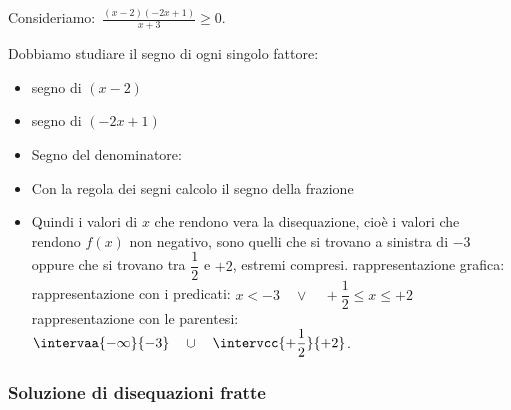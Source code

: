  \begin{esempio}{}{}
Consideriamo:~\(\frac{(x-2)(-2x+1)}{x+3} \geqslant 0\).

Dobbiamo studiare il segno di ogni singolo fattore:
\begin{itemize} [noitemsep, left=0mm]
\item segno di \((x-2)\)\\
\hspace*{-5mm} 
\item segno di \((-2x+1)\)\\
\hspace*{-5mm} 
 \item Segno del denominatore:\\
\hspace*{-5mm} 
\item Con la regola dei segni calcolo il segno della frazione 

\segnomistadisa
\item Quindi i valori di \(x\) che rendono vera la disequazione, cioè i 
valori che rendono \(f(x)\) non negativo, sono quelli 
che si trovano a sinistra di \(-3\) oppure che si trovano 
tra \(\dfrac{1}{2}\) e \(+2\), estremi compresi.
\subitem 
rappresentazione grafica: \quad \raisebox{-3mm}
{}
\subitem rappresentazione con i 
predicati: \quad \(x < -3 \quad \vee \quad 
                +\dfrac{1}{2} \leqslant x \leqslant +2\) 
\subitem rappresentazione con le 
parentesi:\quad \(\intervaa{-\infty}{-3} \quad \cup \quad 
              \intervcc{+\dfrac{1}{2}}{+2}\). 
\end{itemize}
\end{esempio}

\subsubsection{Soluzione di disequazioni fratte}

